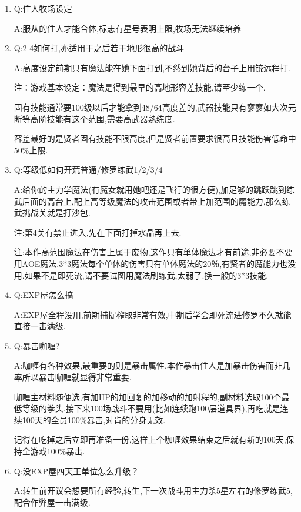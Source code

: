 \begin{enumerate}

	\item
	Q:住人牧场设定

	A:服从的住人才能合体,标志有星号表明上限,牧场无法继续培养

	\item
	Q:2-4如何打,亦适用于之后若干地形很高的战斗

	A:高度设定前期只有魔法能在她下面打到,不然到她背后的台子上用铳远程打.

	注：游戏基本设定：魔法是得到最早的高地形容差技能,请至少练一个.

	固有技能通常要100级以后才能拿到48/64高度差的,武器技能只有寥寥如大次元断等高阶技能有这个范围,需要高武器熟练度.

	容差最好的是贤者固有技能不限高度,但是贤者前置要求很高且技能伤害低命中50\%上限.

	\item
	Q:等级低如何开荒普通/修罗练武1/2/3/4

	A:给你的主力学魔法(有魔女就用她吧还是飞行的很方便),加足够的跳跃跳到练武后面的高台上,配上高等级魔法的攻击范围或者带上加范围的魔能力,那么练武挑战关就是打沙包.

	注:第4关有禁止进入,先在下面打掉水晶再上去.

	注:本作高范围魔法在伤害上属于废物,这作只有单体魔法才有前途,非必要不要用AOE魔法.3*3魔法每个单体的伤害只有单体魔法的20％,有贤者的魔能力也没用.如果不是即死流,请不要试图用魔法刷练武,太弱了.换一般的3*3技能.

	\item
	Q:EXP屋怎么搞

	A:EXP屋全程没用,前期捕捉榨取非常有效,中期后学会即死流进修罗不久就能直接一击满级.

	\item
	Q:暴击咖喱?
	
	A:咖喱有各种效果,最重要的则是暴击属性,本作暴击住人是加暴击伤害而非几率所以暴击咖喱就显得非常重要.

	咖喱主材料随便选,有加HP的加回复的加移动的加射程的,副材料选取100个最低等级的拳头.接下来100场战斗不要用(比如连续跑100层道具界),再吃就是连续100天的全员100\%暴击,对肯的分身无效.

	记得在吃掉之后立即再准备一份,这样上个咖喱效果结束之后就有新的100天,保持全游戏100\%暴击.


	\item
	Q:没EXP屋四天王单位怎么升级？

	A:转生前开议会想要所有经验,转生,下一次战斗用主力杀5星左右的修罗练武5,配合作弊屋一击满级.


\end{enumerate}
